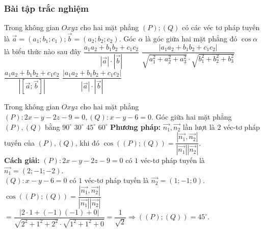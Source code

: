 \subsubsection{Bài tập trắc nghiệm}
\begin{ex}%
	Trong không gian $Oxyz$ cho hai mặt phẳng $(P); (Q)$ có các véc tơ pháp tuyến là $\vec{a}=\left(a_1; b_1; c_1\right);\vec{b}=\left(a_2; b_2; c_2\right)$. Góc $\alpha $ là góc giữa hai mặt phẳng đó $\cos\alpha $ là biểu thức nào sau đây
	\choice
	{$\dfrac{a_1a_2+b_1b_2+c_1c_2}{\left|{\vec{a}}\right|\cdot\left|{\vec{b}}\right|}$}
	{$\dfrac{\left|{a_1a_2+b_1b_2+c_1c_2}\right|}{\sqrt{a_1^2+a_2^2+a_3^2}\cdot\sqrt{b_1^2+b_2^2+b_3^2}}$}
	{$\dfrac{a_1a_2+b_1b_2+c_1c_2}{\left|{\left[{\vec{a};\vec{b}}\right]}\right|}$}
	{\True $\dfrac{\left|{a_1a_2+b_1b_2+c_1c_2}\right|}{\left|{\vec{a}}\right|\cdot\left|{\vec{b}}\right|}$}
\end{ex}
\begin{ex}%
	Trong không gian $Oxyz$  cho hai mặt phẳng $(P)\colon 2x - y-2z-9=0, (Q)\colon  x - y - 6=0$.    Góc giữa hai mặt phẳng  $(P), (Q)$ bằng
	\choice
	{$90^\circ$}
	{$30^\circ$}
	{\True $45^\circ$}
	{$60^\circ$}
	\loigiai
	{{\bfseries Phương pháp:}
		$\overrightarrow{n_1}, \overrightarrow{n_2}$  lần lượt là $2$ véc-tơ pháp tuyến của $(P), (Q)$, khi đó
		$\cos \left(\left( P \right);\left( Q \right)\right) = \dfrac{\left|\overrightarrow{n_1} ,\overrightarrow{n_2}\right|}{\left|\overrightarrow{n_1}\right|\left|\overrightarrow{n_2}\right|}$.\\
		{\bfseries Cách giải:}
		$(P)\colon 2x - y-2z-9=0$ có $1$ véc-tơ pháp tuyến là $\overrightarrow{n_1} = (2;-1;-2)$.\\
		$(Q)\colon  x - y - 6=0$ có $1$ véc-tơ pháp tuyến là $\overrightarrow{n_2} = (1;-1;0)$.\\
		$\cos \left(\left( P \right);\left( Q \right)\right) = \dfrac{\left|\overrightarrow{n_1}, \overrightarrow{n_2}\right|}{\left|\overrightarrow{n_1}\right|\left|\overrightarrow{n_2}\right|} $
		$= \dfrac{\left|2\cdot 1 + \left(- 1\right)\left(- 1\right) + 0\right|}{\sqrt{2^2 + 1^2 + 2^2}\cdot \sqrt{1^2+ 1^2 + 0}}= \dfrac{1}{\sqrt{2}} \Rightarrow \left(\left( P \right);\left( Q \right)\right) = 45^\circ$.
	}
\end{ex}

